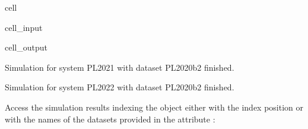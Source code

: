 \documentclass[letterpaper,10pt,english]{sphinxmanual}
\begin{document}
\begin{sphinxuseclass}{cell}
\begin{sphinxuseclass}{cell_input}
\begin{sphinxVerbatim}[commandchars=\\\{\}]
\PYG{p}{[}\PYG{p}{]}
   \PYG{p}{[}\PYG{p}{]}
    \PYG{p}{[}\PYG{p}{]}\PYG{p}{[}\PYG{p}{]}
\end{sphinxVerbatim}

\end{sphinxuseclass}
\begin{sphinxuseclass}{cell_output}
\begin{sphinxVerbatim}[commandchars=\\\{\}]
Simulation for system PL\PYGZus{}2021 with dataset PL\PYGZus{}2020\PYGZus{}b2 finished.
\end{sphinxVerbatim}

\begin{sphinxVerbatim}[commandchars=\\\{\}]
Simulation for system PL\PYGZus{}2022 with dataset PL\PYGZus{}2020\PYGZus{}b2 finished.
\end{sphinxVerbatim}

\end{sphinxuseclass}
\end{sphinxuseclass}
\sphinxAtStartPar
Access  the simulation results indexing the  object either with the index position or with the names of the datasets provided in the attribute :
\end{document}
